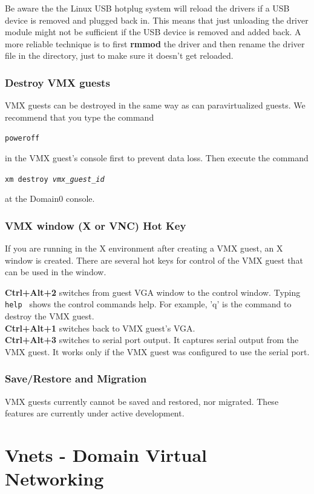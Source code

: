 \documentclass[11pt,twoside,final,openright]{report}
\begin{document}
\begin{description}
Be aware the the Linux USB
hotplug system will reload
the drivers if a USB device
is removed and plugged back
in.
This means that just unloading
the driver module might not
be sufficient if the USB device
is removed and added back.
A more reliable technique is
to first
\textbf{rmmod}
the driver and then rename the
driver file in the
directory,
just to make sure it doesn't get
reloaded.
\end{description}

\subsection{Destroy VMX guests}
VMX guests can be destroyed in the same way as can paravirtualized guests. We recommend that you type the command 

{\small {\tt poweroff}} 

in the VMX guest's console first to prevent data loss. Then execute the command 

{\small {\tt xm destroy \emph{vmx\_guest\_id} }} 

at the Domain0 console.

\subsection{VMX window (X or VNC) Hot Key}
If you are running in the X environment after creating a VMX guest, an X window is created. There are several hot keys for control of the VMX guest that can be used in the window.
 
{\bfseries Ctrl+Alt+2} switches from guest VGA window to the control window. Typing {\small {\tt help }} shows the control commands help. For example, 'q' is the command to destroy the VMX guest.\\
{\bfseries Ctrl+Alt+1} switches back to VMX guest's VGA.\\
{\bfseries Ctrl+Alt+3} switches to serial port output. It captures serial output from the VMX guest. It works only if the VMX guest was configured to use the serial port. \\

\subsection{Save/Restore and Migration}
VMX guests currently cannot be saved and restored, nor migrated. These features are currently under active development.

\chapter{Vnets - Domain Virtual Networking}
\end{document}
